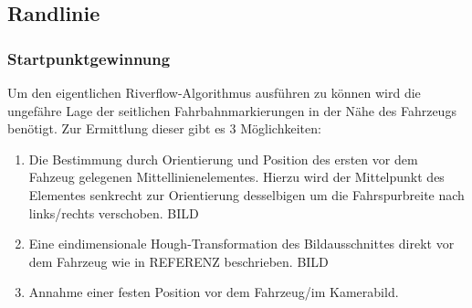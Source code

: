 \subsection{Randlinie}
\subsubsection{Startpunktgewinnung}
Um den eigentlichen Riverflow-Algorithmus ausführen zu können wird die ungefähre Lage der seitlichen Fahrbahnmarkierungen in der Nähe des Fahrzeugs benötigt. Zur Ermittlung dieser gibt es 3 Möglichkeiten:
\begin{enumerate}
\item \label{item:solidline:startpoints:dashedline}
Die Bestimmung durch Orientierung und Position des ersten vor dem Fahzeug gelegenen Mittellinienelementes. Hierzu wird der Mittelpunkt des Elementes senkrecht zur Orientierung desselbigen um die Fahrspurbreite nach links/rechts verschoben. BILD
\item \label{item:solidline:startpoints:hough}
Eine eindimensionale Hough-Transformation des Bildausschnittes direkt vor dem Fahrzeug wie in REFERENZ beschrieben. BILD
\item \label{item:solidline:startpoints:fixed}
Annahme einer festen Position vor dem Fahrzeug/im Kamerabild.
\end{enumerate}

